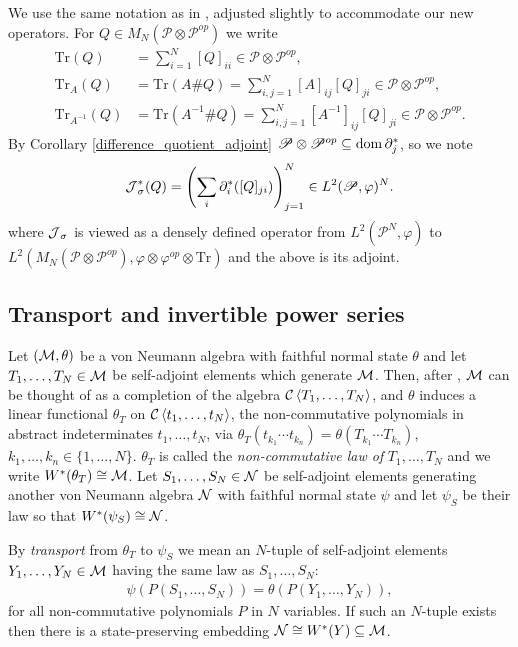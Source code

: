 We use the same notation as in \cite{GS14}, adjusted slightly to accommodate our new operators. For $Q\in M_{N}(\mathscr{P}\otimes \mathscr{P}^{op})$ we write
	\begin{align*}
		\text{Tr}(Q)&=\sum_{i=1}^N [Q]_{ii} \in\mathscr{P}\otimes\mathscr{P}^{op},\\
		\text{Tr}_{A}(Q)&=\text{Tr}(A\# Q) = \sum_{i,j=1}^N [A]_{ij} [Q]_{ji} \in \mathscr{P}\otimes\mathscr{P}^{op},\\
		\text{Tr}_{A^{-1}}(Q) &= \text{Tr}(A^{-1}\# Q) = \sum_{i,j=1}^N [A^{-1}]_{ij} [Q]_{ji}\in\mathscr{P}\otimes\mathscr{P}^{op}.
	\end{align*}
By Corollary \ref{difference_quotient_adjoint} $\mathscr{P}\otimes\mathscr{P}^{op}\subseteq \text{dom}\,\partial_j^*$, so we note
	\begin{align*}
		\operatorname{\mathcal J}_\sigma^*(Q)=\left( \sum_i \partial_i^*([Q]_{ji})\right)_{j=1}^N \in L^2(\mathscr{P},\varphi)^N.
	\end{align*}
where $\operatorname{\mathcal J}_\sigma$ is viewed as a densely defined operator from $L^2(\mathscr{P}^N,\varphi)$ to $L^2(M_N(\mathscr{P}\otimes \mathscr{P}^{op}), \varphi\otimes\varphi^{op}\otimes\text{Tr})$ and the above is its adjoint.


\subsection{Transport and invertible power series}

Let $(\mathcal M,\theta)$ be a von Neumann algebra with faithful normal state $\theta$ and let $T_1,\ldots, T_N\in \mathcal M$ be self-adjoint elements which generate $\mathcal M$. Then, after \cite{GS14}, $\mathcal M$ can be thought of as a completion of the algebra $\mathcal C\left\langle T_1,\ldots, T_N\right\rangle$, and $\theta$ induces a linear functional $\theta_T$ on $\mathcal C\left\langle t_1,\ldots, t_N\right\rangle$, the non-commutative polynomials in abstract indeterminates $t_1,\ldots, t_N$, via $\theta_T(t_{k_1}\cdots t_{k_n})=\theta(T_{k_1}\cdots T_{k_n})$, $k_1,\ldots, k_n\in\{1,\ldots, N\}$. $\theta_T$ is called the \textit{non-commutative law of} $T_1,\ldots, T_N$ and we write $W^*(\theta_T)\cong \mathcal M$. Let $S_1,\ldots, S_N\in \mathcal{N}$ be self-adjoint elements generating another von Neumann algebra $\mathcal{N}$ with faithful normal state $\psi$ and let $\psi_S$ be their law so that $W^*(\psi_S)\cong \mathcal{N}$. 

\begin{defi}\label{transport}
By \textit{transport} from $\theta_T$ to $\psi_S$ we mean an $N$-tuple of self-adjoint elements $Y_1,\ldots, Y_N\in \mathcal M$ having the same law as $S_1,\ldots,S_N$:
	\begin{align*}
		\psi(P(S_1,\ldots, S_N)) = \theta(P(Y_1,\ldots, Y_N)),
	\end{align*}
for all non-commutative polynomials $P$ in $N$ variables. If such an $N$-tuple exists then there is a state-preserving embedding $\mathcal{N}\cong W^*(Y)\subseteq \mathcal M$.
\end{defi}

